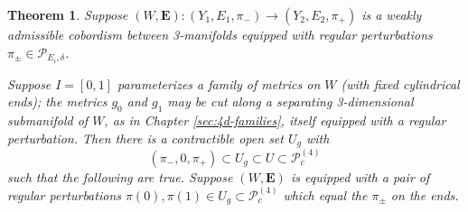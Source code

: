 \documentclass[10pt,a4paper]{amsart}
\newtheorem{theorem}{Theorem}
\theoremstyle{definition}
\theoremstyle{remark}
\numberwithin{figure}{qchap}
\begin{document}
\begin{theorem}\label{FamilyPackage}Suppose $(W,\mathbf{E}): (Y_1, E_1, \pi_-) \to (Y_2, E_2, \pi_+)$ is a weakly admissible cobordism between 3-manifolds equipped with regular perturbations $\pi_\pm \in \mathcal P_{E_i, \delta}$.

Suppose $I = [0,1]$ parameterizes a family of metrics on $W$ (with fixed cylindrical ends); the metrics $g_0$ and $g_1$ may be cut along a separating 3-dimensional submanifold of $W$, as in Chapter \ref{sec:4d-families}, itself equipped with a regular perturbation. Then there is a contractible open set $U_g$ with
$$(\pi_-, 0, \pi_+) \subset U_g \subset U \subset \mathcal P^{(4)}_c$$ such that the following are true. Suppose $(W,\mathbf{E})$ is equipped with a pair of regular perturbations $\pi(0), \pi(1) \in U_g \subset \mathcal P^{(4)}_c$ which equal the $\pi_\pm$ on the ends.


\end{theorem}
\end{document}
